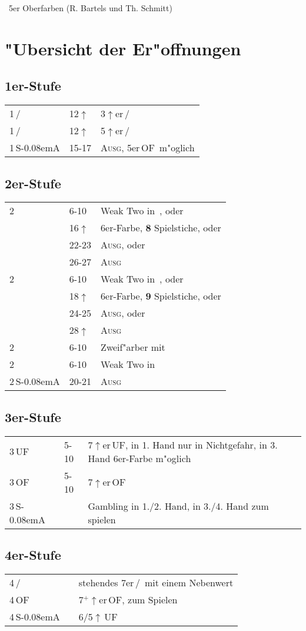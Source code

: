 \documentclass[11pt,german,twocolumn]{scrartcl}
\renewcommand{\Cl}{{\color{ClColor}{\clubs}}}
\renewcommand{\Di}{{\color{DiColor}{\sdiamonds}}}
\renewcommand{\He}{{\color{HeColor}{\shearts}}}
\renewcommand{\Sp}{{\color{SpColor}{\spades}}}
\def\pik{\,\Sp}
\def\coe{\,\He}
\def\kar{\,\Di}
\def\tre{\,\Cl}
\def\mi{\,\Cl /\Di}
\def\ma{\,\He /\Sp}
\def\good{$^+$}
\def\pl{$\uparrow$}
\def\uf{\textsf{\,UF}}
\def\of{\textsf{\,OF}}
\def\sa{\textsf{S\kern-0.08emA}}
\def\SA{\,\sa}
\def\bal{\textsc{Ausg}}
\newcommand\bidins[1]%
{%
\begin{flushleft}
\begin{tabularx}{\columnwidth}{llX}%
#1
\end{tabularx}%
\end{flushleft}
}
\begin{document}
\setlength{\itemsep}{0ex plus0.2ex}

\onecolumn
{\centering\Huge\ 5er Oberfarben (R. Bartels und Th. Schmitt)}
\tableofcontents
\twocolumn

\section{"Ubersicht der Er"offnungen}

\subsection*{1er-Stufe}
\bidins{%
1\mi & 12\pl	& 3\pl er\mi\\[1ex]
1\ma & 12\pl	& 5\pl er\ma\\[1ex]
1\SA & 15-17	& \bal, 5er\of\ m"oglich
}

\subsection*{2er-Stufe}
\bidins{%
2\tre	& 6-10	& Weak Two in \kar, oder\\
	& 16\pl	& 6er-Farbe, \textbf{8} Spielstiche, oder\\
	& 22-23	& \bal, oder\\
	& 26-27	& \bal\\[1ex]
2\kar	& 6-10	& Weak Two in \coe, oder\\
	& 18\pl	& 6er-Farbe, \textbf{9} Spielstiche, oder\\
	& 24-25	& \bal, oder\\
	& 28\pl	& \bal\\[1ex]
2\coe	& 6-10	& Zweif"arber mit \coe\\[1ex]
2\pik	& 6-10	& Weak Two in \pik\\[1ex]
2\SA	& 20-21	& \bal
}

\subsection*{3er-Stufe}
\bidins{%
3\uf	& 5-10	& 7\pl{}er\uf, in 1. Hand nur in Nichtgefahr, in 3. Hand 6er-Farbe m"oglich\\[1ex]
3\of	& 5-10	& 7\pl{}er\of\\[1ex]
3\SA	& 	& Gambling in 1./2. Hand, in 3./4. Hand zum spielen
}

\subsection*{4er-Stufe}
\bidins{%
4\mi	& 	& stehendes 7er\ma\ mit einem Nebenwert\\[1ex]
4\of	&	& 7\good\pl er\of, zum Spielen\\[1ex]
4\SA	&	& 6/5\pl\uf
}
\end{document}
